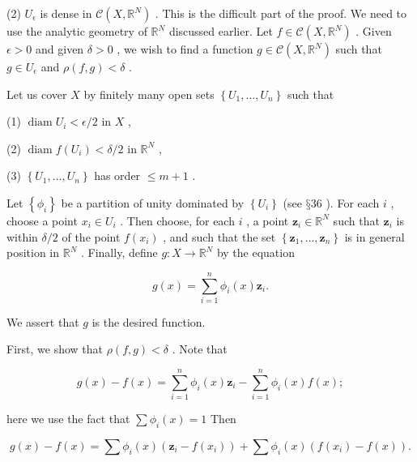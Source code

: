 (2) \({U}_{\epsilon }\) is dense in \(\mathcal{C}\left( {X,{\mathbb{R}}^{N}}\right)\) . This is the difficult part of the proof. We need to use the analytic geometry of \({\mathbb{R}}^{N}\) discussed earlier. Let \(f \in  \mathcal{C}\left( {X,{\mathbb{R}}^{N}}\right)\) . Given \(\epsilon  > 0\) and given \(\delta  > 0\) , we wish to find a function \(g \in  \mathcal{C}\left( {X,{\mathbb{R}}^{N}}\right)\) such that \(g \in  {U}_{\epsilon }\) and \(\rho \left( {f,g}\right)  < \delta\) .

Let us cover \(X\) by finitely many open sets \(\left\{  {{U}_{1},\ldots ,{U}_{n}}\right\}\) such that

(1) \(\operatorname{diam}{U}_{i} < \epsilon /2\) in \(X\) ,

(2) \(\operatorname{diam}f\left( {U}_{i}\right)  < \delta /2\) in \({\mathbb{R}}^{N}\) ,

(3) \(\left\{  {{U}_{1},\ldots ,{U}_{n}}\right\}\) has order \(\leq  m + 1\) .

Let \(\left\{  {\phi }_{i}\right\}\) be a partition of unity dominated by \(\left\{  {U}_{i}\right\}\) (see \(§{36}\) ). For each \(i\) , choose a point \({x}_{i} \in  {U}_{i}\) . Then choose, for each \(i\) , a point \({\mathbf{z}}_{i} \in  {\mathbb{R}}^{N}\) such that \({\mathbf{z}}_{i}\) is within \(\delta /2\) of the point \(f\left( {x}_{i}\right)\) , and such that the set \(\left\{  {{\mathbf{z}}_{1},\ldots ,{\mathbf{z}}_{n}}\right\}\) is in general position in \({\mathbb{R}}^{N}\) . Finally, define \(g : X \rightarrow  {\mathbb{R}}^{N}\) by the equation

\[
g\left( x\right)  = \mathop{\sum }\limits_{{i = 1}}^{n}{\phi }_{i}\left( x\right) {\mathbf{z}}_{i}.
\]

We assert that \(g\) is the desired function.

First, we show that \(\rho \left( {f,g}\right)  < \delta\) . Note that

\[
g\left( x\right)  - f\left( x\right)  = \mathop{\sum }\limits_{{i = 1}}^{n}{\phi }_{i}\left( x\right) {\mathbf{z}}_{i} - \mathop{\sum }\limits_{{i = 1}}^{n}{\phi }_{i}\left( x\right) f\left( x\right) ;
\]

here we use the fact that \(\sum {\phi }_{i}\left( x\right)  = 1\) Then

\[
g\left( x\right)  - f\left( x\right)  = \sum {\phi }_{i}\left( x\right) \left( {{\mathbf{z}}_{i} - f\left( {x}_{i}\right) }\right)  + \sum {\phi }_{i}\left( x\right) \left( {f\left( {x}_{i}\right)  - f\left( x\right) }\right) .
\]

